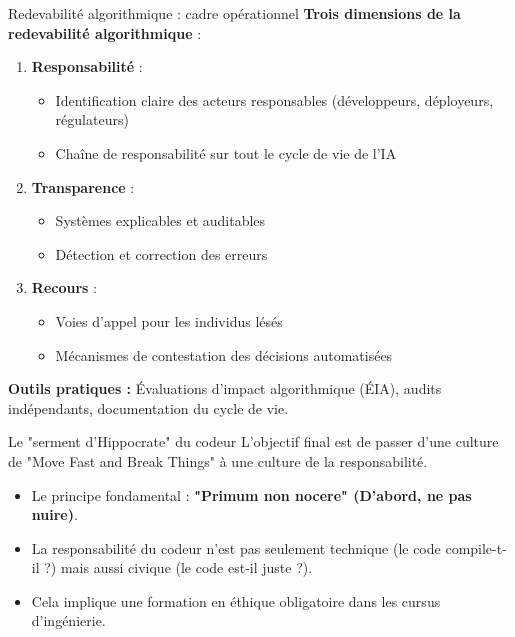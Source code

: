 \documentclass[9pt, aspectratio=169]{beamer}
\begin{document}
\begin{frame}{Redevabilité algorithmique : cadre opérationnel}
    \textbf{Trois dimensions de la redevabilité algorithmique} :
    
    \vspace{0.3cm}
    \begin{enumerate}
        \item \textbf{Responsabilité} : 
        \begin{itemize}
            \item Identification claire des acteurs responsables (développeurs, déployeurs, régulateurs)
            \item Chaîne de responsabilité sur tout le cycle de vie de l'IA
        \end{itemize}
        
        \item \textbf{Transparence} : 
        \begin{itemize}
            \item Systèmes explicables et auditables
            \item Détection et correction des erreurs
        \end{itemize}
        
        \item \textbf{Recours} : 
        \begin{itemize}
            \item Voies d'appel pour les individus lésés
            \item Mécanismes de contestation des décisions automatisées
        \end{itemize}
    \end{enumerate}
    
    \vspace{0.3cm}
    \textbf{Outils pratiques :} Évaluations d'impact algorithmique (ÉIA), audits indépendants, documentation du cycle de vie.
\end{frame}

\begin{frame}{Le "serment d'Hippocrate" du codeur}
    L'objectif final est de passer d'une culture de "Move Fast and Break Things" à une culture de la responsabilité.
    \begin{itemize}
        \item Le principe fondamental : \textbf{"Primum non nocere" (D'abord, ne pas nuire)}.
        \item La responsabilité du codeur n'est pas seulement technique (le code compile-t-il ?) mais aussi civique (le code est-il juste ?).
        \item Cela implique une formation en éthique obligatoire dans les cursus d'ingénierie.
    \end{itemize}
\end{frame}
\end{document}
